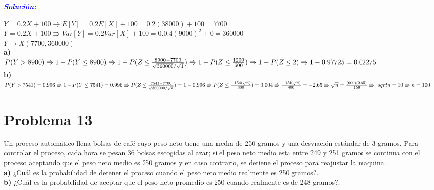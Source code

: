 \documentclass[a4paper,openright,12pt]{book}
\begin{document}
{\begin{center}
	\textbf{\textit{\textcolor{blue}{Solución:}}}\\
\end{center}

\vspace{0.5em}
$Y = 0.2X + 100 \Rrightarrow E[Y] = 0.2E[X] + 100 = 0.2(38000) + 100 = 7700$\\\vspace{0.5em}
$Y = 0.2X + 100 \Rrightarrow Var[Y] = 0.2Var[X] + 100 = 0.0.4 (9000)^{2} + 0 = 360000 $ \\\vspace{0.5em}
$Y \rightarrow X(7700,360000)$\\

\textbf{a)}\\

$P(Y > 8900) \Rrightarrow 1-P(Y \leq 8900)\\ \Rrightarrow 1-P(Z \leq \frac{8900 - 7700}{\sqrt{360000}/\sqrt{1}}) \Rrightarrow 1 - P(Z \leq \frac{1200}{600}) \Rrightarrow 1 - P(Z \leq 2) \Rrightarrow 1 - 0.97725 = 0.02275$\\

\textbf{b)}\\

$P(Y > 7541) = 0.996 \Rrightarrow 1-P(Y \leq 7541) = 0.996\\ \Rrightarrow P(Z \leq \frac{7541 - 7700}{\sqrt{360000}/\sqrt{n}}) = 1 - 0.996 \Rrightarrow P(Z \leq \frac{-154(\sqrt{n})}{600}) = 0.004\\
\Rrightarrow \frac{-154(\sqrt{n})}{600} = -2.65 \Rrightarrow \sqrt{n} = \frac{(600)(2.65)}{159} \Rrightarrow \ sqrt{n} = 10 \Rrightarrow n = 100$


\section{Problema 13}
Un proceso automático llena bolsas de café cuyo peso neto tiene una media de 250 gramos y una desviación estándar de 3 gramos. Para controlar el proceso, cada hora se pesan 36 bolsas escogidas al azar; si el peso neto medio esta entre 249 y 251 gramos se continua con el proceso aceptando que el peso neto medio es 250 gramos y en caso contrario, se detiene el proceso para reajustar la maquina.\\
\textbf{a)} ¿Cuál es la probabilidad de detener el proceso cuando el peso neto medio realmente es 250 gramos?.\\
\textbf{b)} ¿Cuál es la probabilidad de aceptar que el peso neto promedio es 250 cuando realmente es de 248 gramos?.\\

}
\end{document}
